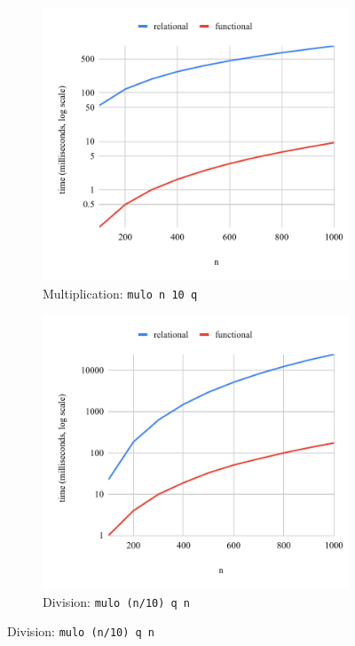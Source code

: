 \begin{figure}[h]
  \centering
  \begin{subfigure}[b]{0.49\textwidth}
    \includegraphics[width=\textwidth]{fig/muloIIO.pdf}
    \caption{Multiplication: \lstinline{mulo n 10 q}}
    \label{fig:mulo_IIO}
  \end{subfigure}
  \hfill
  \begin{subfigure}[b]{0.49\textwidth}
    \includegraphics[width=1\textwidth]{fig/muloIOI.pdf}
    \caption{Division: \lstinline{mulo (n/10) q n}}
    \label{fig:mulo_IOI}
  \end{subfigure}


\end{figure}
